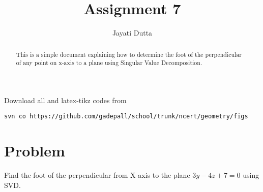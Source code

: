 \documentclass[journal,12pt,twocolumn]{IEEEtran}
\begin{document}
\let\StandardTheFigure\thefigure
\let\vec\mathbf
\renewcommand{\thefigure}{\theproblem}



\def\putbox#1#2#3{\makebox[0in][l]{\makebox[#1][l]{}\raisebox{\baselineskip}[0in][0in]{\raisebox{#2}[0in][0in]{#3}}}}
     \def\rightbox#1{\makebox[0in][r]{#1}}
     \def\centbox#1{\makebox[0in]{#1}}
     \def\topbox#1{\raisebox{-\baselineskip}[0in][0in]{#1}}
     \def\midbox#1{\raisebox{-0.5\baselineskip}[0in][0in]{#1}}

\vspace{3cm}


\title{Assignment 7}
\author{Jayati Dutta}





\maketitle

\newpage


\bigskip

\renewcommand{\thefigure}{\theenumi}
\renewcommand{\thetable}{\theenumi}


\begin{abstract}
This is a simple document explaining how to determine the foot of the perpendicular of any point on x-axis to a plane using Singular Value Decomposition.
\end{abstract}

%

Download all and latex-tikz codes from 
%
\begin{lstlisting}
svn co https://github.com/gadepall/school/trunk/ncert/geometry/figs
\end{lstlisting}
%


\section{Problem}
Find the foot of the perpendicular from X-axis to the plane $3y-4z+7 =0$ using SVD.
\end{document}
